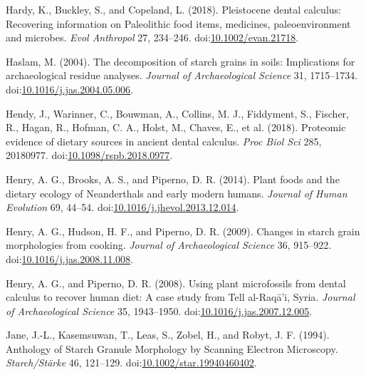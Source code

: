\documentclass[utf8]{../templates/frontiersSCNS}
\newlength{\cslhangindent}
\newlength{\cslentryspacingunit} %
\newenvironment{CSLReferences}[2] %
 {%
  \setlength{\parindent}{0pt}
  \ifodd #1
  \let\oldpar\par
  \def\par{\hangindent=\cslhangindent\oldpar}
  \fi
  \setlength{\parskip}{#2\cslentryspacingunit}
 }%
 {}
\begin{document}
\begin{CSLReferences}{1}{0}
\leavevmode{}%
Hardy, K., Buckley, S., and Copeland, L. (2018). Pleistocene dental calculus: {Recovering} information on {Paleolithic} food items, medicines, paleoenvironment and microbes. \emph{Evol Anthropol} 27, 234--246. doi:\href{https://doi.org/10.1002/evan.21718}{10.1002/evan.21718}.

\leavevmode{}%
Haslam, M. (2004). The decomposition of starch grains in soils: Implications for archaeological residue analyses. \emph{Journal of Archaeological Science} 31, 1715--1734. doi:\href{https://doi.org/10.1016/j.jas.2004.05.006}{10.1016/j.jas.2004.05.006}.

\leavevmode{}%
Hendy, J., Warinner, C., Bouwman, A., Collins, M. J., Fiddyment, S., Fischer, R., Hagan, R., Hofman, C. A., Holst, M., Chaves, E., et al. (2018). Proteomic evidence of dietary sources in ancient dental calculus. \emph{Proc Biol Sci} 285, 20180977. doi:\href{https://doi.org/10.1098/rspb.2018.0977}{10.1098/rspb.2018.0977}.

\leavevmode{}%
Henry, A. G., Brooks, A. S., and Piperno, D. R. (2014). Plant foods and the dietary ecology of {Neanderthals} and early modern humans. \emph{Journal of Human Evolution} 69, 44--54. doi:\href{https://doi.org/10.1016/j.jhevol.2013.12.014}{10.1016/j.jhevol.2013.12.014}.

\leavevmode{}%
Henry, A. G., Hudson, H. F., and Piperno, D. R. (2009). Changes in starch grain morphologies from cooking. \emph{Journal of Archaeological Science} 36, 915--922. doi:\href{https://doi.org/10.1016/j.jas.2008.11.008}{10.1016/j.jas.2008.11.008}.

\leavevmode{}%
Henry, A. G., and Piperno, D. R. (2008). Using plant microfossils from dental calculus to recover human diet: A case study from {Tell} al-{Raqā}'i, {Syria}. \emph{Journal of Archaeological Science} 35, 1943--1950. doi:\href{https://doi.org/10.1016/j.jas.2007.12.005}{10.1016/j.jas.2007.12.005}.

\leavevmode{}%
Jane, J.-L., Kasemsuwan, T., Leas, S., Zobel, H., and Robyt, J. F. (1994). Anthology of {Starch Granule Morphology} by {Scanning Electron Microscopy}. \emph{Starch/Stärke} 46, 121--129. doi:\href{https://doi.org/10.1002/star.19940460402}{10.1002/star.19940460402}.


\end{CSLReferences}
\end{document}
